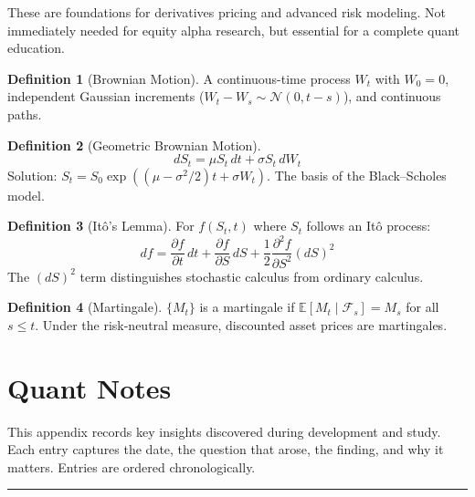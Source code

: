 \documentclass[a4paper, 11pt]{report}
\theoremstyle{definition}
\newtheorem{definition}{Definition}[chapter]
\theoremstyle{remark}
\begin{document}
These are foundations for derivatives pricing and advanced risk modeling.  Not
immediately needed for equity alpha research, but essential for a complete
quant education.

\begin{definition}[Brownian Motion]
    A continuous-time process $W_t$ with $W_0 = 0$, independent Gaussian
    increments ($W_t - W_s \sim \mathcal{N}(0, t-s)$), and continuous paths.
\end{definition}

\begin{definition}[Geometric Brownian Motion]
    \[
        dS_t = \mu S_t\,dt + \sigma S_t\,dW_t
    \]
    Solution: $S_t = S_0 \exp((\mu - \sigma^2/2)t + \sigma W_t)$.
    The basis of the Black--Scholes model.
\end{definition}

\begin{definition}[It\^{o}'s Lemma]
    For $f(S_t, t)$ where $S_t$ follows an It\^{o} process:
    \[
        df = \frac{\partial f}{\partial t}\,dt
           + \frac{\partial f}{\partial S}\,dS
           + \frac{1}{2}\frac{\partial^2 f}{\partial S^2}(dS)^2
    \]
    The $(dS)^2$ term distinguishes stochastic calculus from ordinary calculus.
\end{definition}

\begin{definition}[Martingale]
    $\{M_t\}$ is a martingale if
    $\mathbb{E}[M_t \mid \mathcal{F}_s] = M_s$ for all $s \leq t$.
    Under the risk-neutral measure, discounted asset prices are martingales.
\end{definition}


\chapter{Quant Notes}
\label{app:notes}

This appendix records key insights discovered during development and study.
Each entry captures the date, the question that arose, the finding,
and why it matters.  Entries are ordered chronologically.

\bigskip\noindent\rule{\textwidth}{0.4pt}
\end{document}
